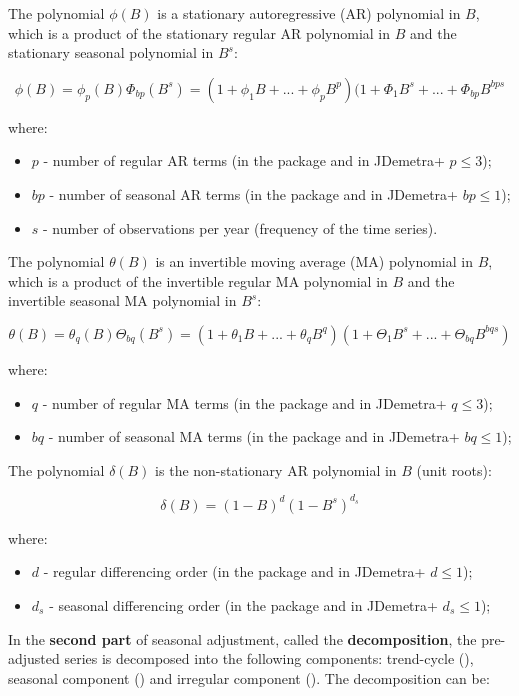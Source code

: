 \documentclass[article]{jss}
\providecommand{\tightlist}{%
  \setlength{\itemsep}{0pt}\setlength{\parskip}{0pt}}
\begin{document}
The polynomial \(\phi(B)\) is a stationary autoregressive (AR)
polynomial in \(B\), which is a product of the stationary regular AR
polynomial in \(B\) and the stationary seasonal polynomial in \(B^s\):

\[\phi(B)=\phi_p(B)\Phi_{bp}(B^s)=(1+\phi_1B+...+\phi_pB^p)(1+\Phi_1B^s+...+\Phi_{bp}B^{bps}\]

where:

\begin{itemize}
\tightlist
\item
  \(p\) - number of regular AR terms (in the package and in JDemetra+
  \(p \le 3\));
\item
  \(bp\) - number of seasonal AR terms (in the package and in JDemetra+
  \(bp \le 1\));
\item
  \(s\) - number of observations per year (frequency of the time
  series).
\end{itemize}

The polynomial \(\theta(B)\) is an invertible moving average (MA)
polynomial in \(B\), which is a product of the invertible regular MA
polynomial in \(B\) and the invertible seasonal MA polynomial in
\(B^s\):

\[\theta(B)=\theta_q(B)\Theta_{bq}(B^s)=(1+\theta_1B+...+\theta_qB^q)(1+\Theta_1B^s+...+\Theta_{bq}B^{bqs})\]

where:

\begin{itemize}
\tightlist
\item
  \(q\) - number of regular MA terms (in the package and in JDemetra+
  \(q \le 3\));
\item
  \(bq\) - number of seasonal MA terms (in the package and in JDemetra+
  \(bq \le 1\));
\end{itemize}

The polynomial \(\delta(B)\) is the non-stationary AR polynomial in
\(B\) (unit roots):

\[\delta(B)=(1-B)^d(1-B^s)^{d_s}\]

where:

\begin{itemize}
\tightlist
\item
  \(d\) - regular differencing order (in the package and in JDemetra+
  \(d \le 1\));
\item
  \(d_s\) - seasonal differencing order (in the package and in JDemetra+
  \(d_s \le 1\));
\end{itemize}

In the \textbf{second part} of seasonal adjustment, called the
\textbf{decomposition}, the pre-adjusted series is decomposed into the
following components: trend-cycle (), seasonal component
() and irregular component (). The decomposition can be:
\end{document}
